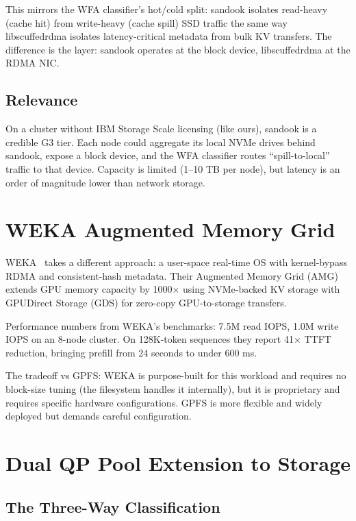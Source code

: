 \documentclass[11pt,letterpaper]{article}
\begin{document}
This mirrors the WFA classifier's hot/cold split: sandook isolates read-heavy (cache hit) from write-heavy (cache spill) SSD traffic the same way libscuffedrdma isolates latency-critical metadata from bulk KV transfers. The difference is the layer: sandook operates at the block device, libscuffedrdma at the RDMA NIC.

\subsection{Relevance}

On a cluster without IBM Storage Scale licensing (like ours), sandook is a credible G3 tier. Each node could aggregate its local NVMe drives behind sandook, expose a block device, and the WFA classifier routes ``spill-to-local'' traffic to that device. Capacity is limited (1--10 TB per node), but latency is an order of magnitude lower than network storage.

\section{WEKA Augmented Memory Grid}

WEKA~\cite{weka2025amg} takes a different approach: a user-space real-time OS with kernel-bypass RDMA and consistent-hash metadata. Their Augmented Memory Grid (AMG) extends GPU memory capacity by 1000$\times$ using NVMe-backed KV storage with GPUDirect Storage (GDS) for zero-copy GPU-to-storage transfers.

Performance numbers from WEKA's benchmarks: 7.5M read IOPS, 1.0M write IOPS on an 8-node cluster. On 128K-token sequences they report 41$\times$ TTFT reduction, bringing prefill from 24 seconds to under 600 ms.

The tradeoff vs GPFS: WEKA is purpose-built for this workload and requires no block-size tuning (the filesystem handles it internally), but it is proprietary and requires specific hardware configurations. GPFS is more flexible and widely deployed but demands careful configuration.

\section{Dual QP Pool Extension to Storage}

\subsection{The Three-Way Classification}
\end{document}
